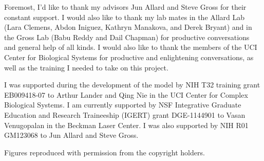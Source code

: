 \acknowledgments
{
Foremost, I'd like to thank my advisors Jun Allard and Steve Gross for their constant support. I would also like to thank my lab mates in the Allard Lab (Lara Clemens, Abdon Iniguez, Kathryn Manakova, and Derek Bryant) and in the Gross Lab (Babu Reddy and Dail Chapman) for productive conversations and general help of all kinds. I would also like to thank the members of the UCI Center for Biological Systems for productive and enlightening conversations, as well as the training I needed to take on this project.

I was supported during the development of the model by NIH T32 training grant EB009418-07 to Arthur Lander and Qing Nie in the UCI Center for Complex Biological Systems. I am currently supported by NSF Integrative Graduate Education and Research Traineeship (IGERT) grant DGE-1144901 to Vasan Venugopalan in the Beckman Laser Center. I was also supported by NIH R01 GM123068 to Jun Allard and Steve Gross.

Figures reproduced with permission from the copyright holders.
}


\newcommand{\mypubentry}[3]{
  \begin{tabular*}{1\textwidth}{@{\extracolsep{\fill}}p{4.5in}r}
    \textbf{#1} & \textbf{#2} \\ 
    \multicolumn{2}{@{\extracolsep{\fill}}p{.95\textwidth}}{#3}\vspace{6pt} \\
  \end{tabular*}
}
\newcommand{\mysoftentry}[3]{
  \begin{tabular*}{1\textwidth}{@{\extracolsep{\fill}}lr}
    \textbf{#1} & \url{#2} \\
    \multicolumn{2}{@{\extracolsep{\fill}}p{.95\textwidth}}
    {\emph{#3}}\vspace{-6pt} \\
  \end{tabular*}
}

